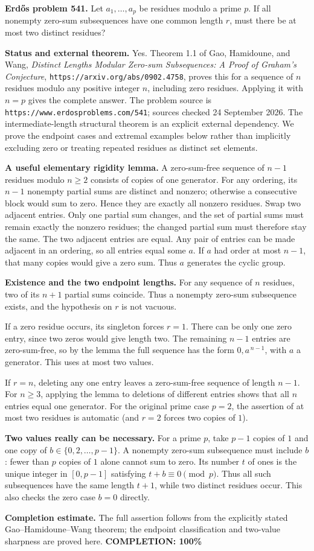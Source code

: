 \textbf{Erd\H{o}s problem 541.}
Let $a_1,\ldots,a_p$ be residues modulo a prime $p$. If all nonempty zero-sum subsequences have one common length $r$, must there be at most two distinct residues?

\textbf{Status and external theorem.}
Yes. Theorem 1.1 of Gao, Hamidoune, and Wang,
\emph{Distinct Lengths Modular Zero-sum Subsequences: A Proof of Graham's Conjecture},
\texttt{https://arxiv.org/abs/0902.4758},
proves this for a sequence of $n$ residues modulo any positive integer $n$, including zero residues. Applying it with $n=p$ gives the complete answer.
The problem source is \texttt{https://www.erdosproblems.com/541}; sources checked 24 September 2026.
The intermediate-length structural theorem is an explicit external dependency. We prove the endpoint cases and extremal examples below rather than implicitly excluding zero or treating repeated residues as distinct set elements.

\textbf{A useful elementary rigidity lemma.}
A zero-sum-free sequence of $n-1$ residues modulo $n\geq2$ consists of copies of one generator.
For any ordering, its $n-1$ nonempty partial sums are distinct and nonzero; otherwise a consecutive block would sum to zero. Hence they are exactly all nonzero residues.
Swap two adjacent entries. Only one partial sum changes, and the set of partial sums must remain exactly the nonzero residues; the changed partial sum must therefore stay the same. The two adjacent entries are equal. Any pair of entries can be made adjacent in an ordering, so all entries equal some $a$. If $a$ had order at most $n-1$, that many copies would give a zero sum. Thus $a$ generates the cyclic group.

\textbf{Existence and the two endpoint lengths.}
For any sequence of $n$ residues, two of its $n+1$ partial sums coincide. Thus a nonempty zero-sum subsequence exists, and the hypothesis on $r$ is not vacuous.

If a zero residue occurs, its singleton forces $r=1$. There can be only one zero entry, since two zeros would give length two. The remaining $n-1$ entries are zero-sum-free, so by the lemma the full sequence has the form $0,a^{\,n-1}$, with $a$ a generator. This uses at most two values.

If $r=n$, deleting any one entry leaves a zero-sum-free sequence of length $n-1$. For $n\geq3$, applying the lemma to deletions of different entries shows that all $n$ entries equal one generator. For the original prime case $p=2$, the assertion of at most two residues is automatic (and $r=2$ forces two copies of $1$).

\textbf{Two values really can be necessary.}
For a prime $p$, take $p-1$ copies of $1$ and one copy of $b\in\{0,2,\ldots,p-1\}$. A nonempty zero-sum subsequence must include $b$: fewer than $p$ copies of $1$ alone cannot sum to zero. Its number $t$ of ones is the unique integer in $[0,p-1]$ satisfying $t+b\equiv0\pmod p$. Thus all such subsequences have the same length $t+1$, while two distinct residues occur. This also checks the zero case $b=0$ directly.

\textbf{Completion estimate.}
The full assertion follows from the explicitly stated Gao--Hamidoune--Wang theorem; the endpoint classification and two-value sharpness are proved here.
\textbf{COMPLETION: 100\%}
